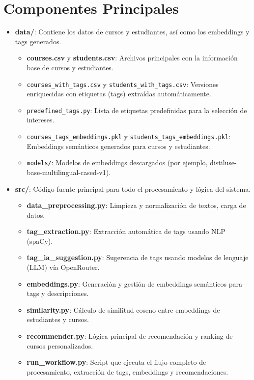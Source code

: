 \documentclass[12pt]{article}
\begin{document}
\section{Componentes Principales}
\begin{itemize}
    \item \textbf{data/}: Contiene los datos de cursos y estudiantes, así como los embeddings y tags generados.
    \begin{itemize}
        \item \textbf{courses.csv} y \textbf{students.csv}: Archivos principales con la información base de cursos y estudiantes.
        \item \texttt{courses\_with\_tags.csv} y \texttt{students\_with\_tags.csv}: Versiones enriquecidas con etiquetas (tags) extraídas automáticamente.
        \item \texttt{predefined\_tags.py}: Lista de etiquetas predefinidas para la selección de intereses.
        \item \texttt{courses\_tags\_embeddings.pkl} y \texttt{students\_tags\_embeddings.pkl}: Embeddings semánticos generados para cursos y estudiantes.
        \item \texttt{models/}: Modelos de embeddings descargados (por ejemplo, distiluse-base-multilingual-cased-v1).
    \end{itemize}
    \item \textbf{src/}: Código fuente principal para todo el procesamiento y lógica del sistema.
    \begin{itemize}
        \item \textbf{data\_preprocessing.py}: Limpieza y normalización de textos, carga de datos.
        \item \textbf{tag\_extraction.py}: Extracción automática de tags usando NLP (spaCy).
        \item \textbf{tag\_ia\_suggestion.py}: Sugerencia de tags usando modelos de lenguaje (LLM) vía OpenRouter.
        \item \textbf{embeddings.py}: Generación y gestión de embeddings semánticos para tags y descripciones.
        \item \textbf{similarity.py}: Cálculo de similitud coseno entre embeddings de estudiantes y cursos.
        \item \textbf{recommender.py}: Lógica principal de recomendación y ranking de cursos personalizados.
        \item \textbf{run\_workflow.py}: Script que ejecuta el flujo completo de procesamiento, extracción de tags, embeddings y recomendaciones.

\end{itemize}
\end{itemize}
\end{document}
